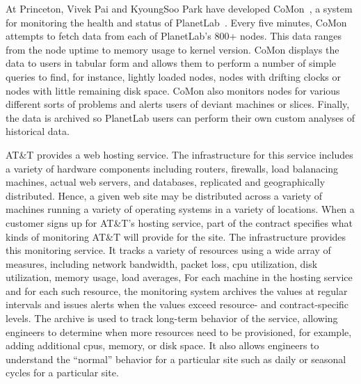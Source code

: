 
At Princeton, Vivek Pai and KyoungSoo Park have developed
CoMon~\cite{comon}, a system for monitoring the health and status of
PlanetLab~\cite{planetlab}.  Every five minutes, CoMon attempts to
fetch data from each of PlanetLab's 800+ nodes.  This data ranges from
the node uptime to memory usage to kernel version.  
CoMon displays the data to users in tabular form and allows them to
perform a number of simple queries to find, for instance, lightly
loaded nodes, nodes with drifting clocks or nodes with little
remaining disk space.  CoMon also monitors nodes for various different
sorts of problems and alerts users of deviant machines or slices.
Finally, the data is archived so PlanetLab users can perform their own
custom analyses of historical data.

AT\&T provides a web hosting service.  The infrastructure for this
service includes a variety of hardware components including routers,
firewalls, load balanacing machines, actual web servers, and
databases, replicated and geographically distributed.  Hence, a given
web site may be distributed across a variety of machines running a
variety of operating systems in a variety of locations.  When a
customer signs up for AT\&T's hosting service, part of the contract
specifies what kinds of monitoring AT\&T will provide for the site.
The \vizGems{} infrastructure provides this monitoring
service.  It tracks a variety of resources using a wide array of
measures, including network
bandwidth, packet loss, cpu utilization, disk utilization, memory
usage, load averages, \etc{} For each machine in the hosting service
and for each such resource, the monitoring system archives the values at
regular intervals and issues alerts when the values exceed resource-
and contract-specific levels.  The archive is used to track long-term
behavior of the service, allowing engineers to determine when more
resources need to be provisioned, for example, adding additional cpus,
memory, or disk space.  It also allows engineers to understand the
``normal'' behavior for a particular site such as daily or seasonal
cycles for a particular site.


